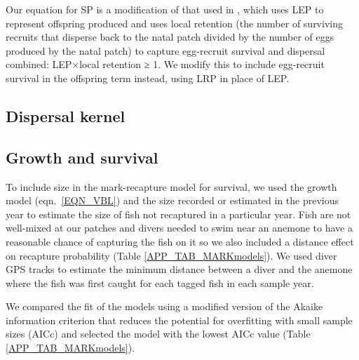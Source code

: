 \documentclass[12pt, oneside]{article}   	%
\begin{document}
Our equation for SP is a modification of that used in \cite{burgess2014beyond}, which uses LEP to represent offspring produced and uses local retention (the number of surviving recruits that disperse back to the natal patch divided by the number of eggs produced by the natal patch) to capture egg-recruit survival and dispersal combined: LEP×local retention ≥ 1. We modify this to include egg-recruit survival in the offspring term instead, using LRP in place of LEP.

\subsection{Dispersal kernel} \label{APP_SEC_METHODS_Dispersal}

\subsection{Growth and survival} \label{APP_SEC_METHODS_Growth_and_survival}

To include size in the mark-recapture model for survival, we used the growth model (eqn.\ \ref{EQN_VBL}) and the size recorded or estimated in the previous year to estimate the size of fish not recaptured in a particular year. Fish are not well-mixed at our patches and divers needed to swim near an anemone to have a reasonable chance of capturing the fish on it so we also included a distance effect on recapture probability (Table \ref{APP_TAB_MARKmodels}). We used diver GPS tracks to estimate the minimum distance between a diver and the anemone where the fish was first caught for each tagged fish in each sample year.

We compared the fit of the models using a modified version of the Akaike information criterion that reduces the potential for overfitting with small sample sizes (AICc) and selected the model with the lowest AICc value (Table \ref{APP_TAB_MARKmodels}).


\end{document}
